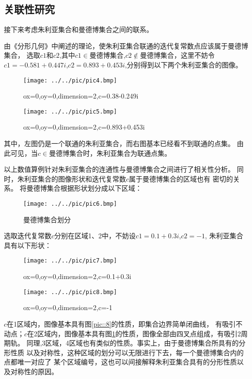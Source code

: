 \subsection{关联性研究}
接下来考虑朱利亚集合和曼德博集合之间的联系。
\par 
由《分形几何》\cite{1997Techniques}中阐述的理论，使朱利亚集合联通的迭代复常数点应该属于曼德博集合，
选取$c1$和$c2$,其中$c1 \in$曼德博集合,$c2 \notin$曼德博集合，这里不妨令
$c1=-0.581+0.447i$,$c2=0.893+0.453i$,分别得到以下两个朱利亚集合的图像。
\begin{figure}[H]
    \begin{minipage}[t]{0.5\linewidth}
        \centering
        \texttt{[image: ../../pic/pic4.bmp]}
        \caption{ox=0,oy=0,dimension=2,c=0.38-0.249i}        
    \end{minipage}
    \begin{minipage}[t]{0.5\linewidth}
        \centering
        \texttt{[image: ../../pic/pic5.bmp]}
        \caption{ox=0,oy=0,dimension=2,c=0.893+0.453i}        
    \end{minipage}   
\end{figure} 
\par 
其中，左图仍是一个联通的朱利亚集合，而右图基本已经看不到联通的点集。
由此可见，当$c \in$曼德博集合时，朱利亚集合为联通点集。
\par 
以上数值算例针对朱利亚集合的连通性与曼德博集合之间进行了相关性分析。
同时，朱利亚集合的图像形状和迭代复常数$c$属于曼德博集合的区域也有
密切的关系。
将曼德博集合根据形状划分成以下区域：
\begin{figure}[H]
    \centering
    \texttt{[image: ../../pic/pic6.bmp]}
    \caption{曼德博集合划分}
\end{figure}
选取迭代复常数$c$分别在区域1、2中，不妨设$c1=0.1+0.3i$,$c2=-1$,
朱利亚集合具有以下形状：
\begin{figure}[H]
    \begin{minipage}[t]{0.5\linewidth}
        \centering
        \texttt{[image: ../../pic/pic7.bmp]}
        \caption{ox=0,oy=0,dimension=2,c=0.1+0.3i}
        \label{pic::8}        
    \end{minipage}
    \begin{minipage}[t]{0.5\linewidth}
        \centering
        \texttt{[image: ../../pic/pic8.bmp]}
        \caption{ox=0,oy=0,dimension=2,c=-1}   
        \label{pic::9}     
    \end{minipage}   
\end{figure}
\par 
$c$在1区域内，图像基本具有图\ref{pic::8}的性质，即集合边界简单闭曲线，
有吸引不动点；$c$在2区域内，图像基本具有图\ref{pic::9}的性质，图像全部由四叉点组成，有吸引2周期轨。
同理,3区域，4区域也有类似的性质。事实上，由于曼德博集合所具有的分形性质
以及对称性，这种区域的划分可以无限进行下去，每一个曼德博集合内的点都唯一对应了
某个区域编号，这也可以间接解释朱利亚集合具有的分形性质以及对称性的原因。

